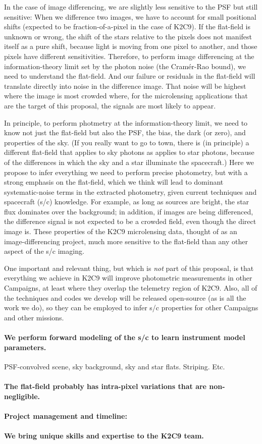 \documentclass[12pt,preprint]{aastex}
\begin{document}
In the case of image differencing, we are slightly less sensitive to the
PSF but still sensitive:
When we difference two images, we have to account for small positional
shifts (expected to be fraction-of-a-pixel in the case of K2C9).
If the flat-field is unknown or wrong, the shift of the stars relative
to the pixels does not manifest itself as a pure shift, because light
is moving from one pixel to another, and those pixels have different
sensitivities.
Therefore, to perform image differencing at the information-theory
limit set by the photon noise (the Cram\'er-Rao bound), we need to
understand the flat-field.
And our failure or residuals in the flat-field will translate directly
into noise in the difference image.
That noise will be highest where the image is most crowded where, for
the microlensing applications that are the target of this proposal,
the signals are most likely to appear.

In principle, to perform photmetry at the information-theory limit,
we need to know not just the flat-field but also the PSF, the bias,
the dark (or zero), and properties of the sky.
(If you really want to go to town, there is (in principle) a different
flat-field that applies to sky photons as applies to star photons,
because of the differences in which the sky and a star illuminate the
spacecraft.)
Here we propose to infer everything we need to perform precise
photometry, but with a strong emphasis on the flat-field, which we
think will lead to dominant systematic-noise terms in the extracted
photometry, given current techniques and spacecraft (s/c) knowledge.
For example, as long as sources are bright, the star flux dominates
over the background; in addition, if images are being differenced, the
difference signal is not expected to be a crowded field, even though
the direct image is.
These properties of the K2C9 microlensing data, thought of as an
image-differencing project, much more sensitive to the flat-field than
any other aspect of the s/c imaging.

One important and relevant thing, but which is \emph{not} part of this
proposal, is that everything we achieve in K2C9 will improve photometric
measurements in other Campaigns, at least where they overlap the
telemetry region of K2C9.
Also, all of the techniques and codes we develop will be released
open-source (as is all the work we do), so they can be employed to
infer s/c properties for other Campaigns and other missions.

\paragraph{We perform forward modeling of the s/c to learn instrument model parameters.}

PSF-convolved scene, sky background, sky and star flats.  Striping.  Etc.

\paragraph{The flat-field probably has intra-pixel variations that are non-negligible.}

\paragraph{Project management and timeline:}

\paragraph{We bring unique skills and expertise to the K2C9 team.}
\end{document}
